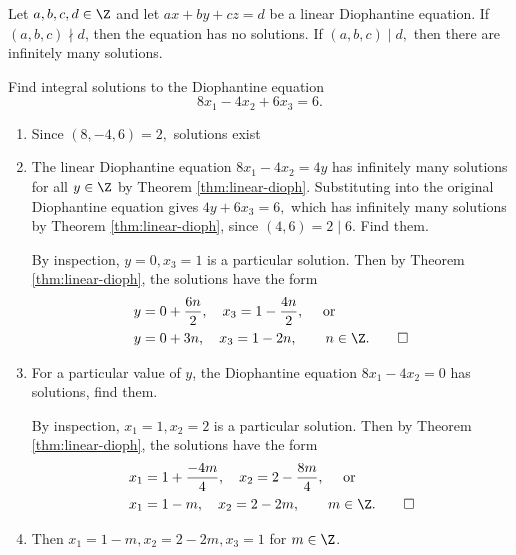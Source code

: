 \documentclass{ximera}
\begin{document}
\begin{proposition}\label{prop:3diophantine}
    Let $a,b,c,d\in\Z$ and let $ax+by+cz=d$ be a linear Diophantine equation. If $(a,b,c)\nmid d$, then the equation has no solutions. If $(a,b,c)\mid d,$ then there are infinitely many solutions.
\end{proposition}

\begin{br}
Find integral solutions to the Diophantine equation \[8x_1-4x_2+6x_3=6.\]

\begin{enumerate}
    \item Since $(8,-4,6)=2,$ solutions exist
    \item The linear Diophantine equation $8x_1-4x_2=4y$ has infinitely many solutions for all $y\in\Z$ by Theorem \ref{thm:linear-dioph}. Substituting into the original Diophantine equation gives $4y+6x_3=6,$ which has infinitely many solutions by Theorem \ref{thm:linear-dioph}, since $(4,6)=2\mid 6$. Find them.
     
    \begin{solution}
        By inspection, $y=0,x_3=1$ is a particular solution. Then by Theorem \ref{thm:linear-dioph}, the solutions have the form 
        \begin{align*}
            y&=0+\frac{6n}{2},\quad x_3=1-\frac{4n}{2}, \quad \textnormal{ or }\\
            y&=0+3n,\quad x_3=1-2n, \qquad n\in\Z. \qedhere
        \end{align*}
        \end{solution}
    \item  For a particular value of $y$, the Diophantine equation $8x_1-4x_2=0$ has solutions, find them. 
    \begin{solution}
        By inspection, $x_1=1,x_2=2$ is a particular solution. Then by Theorem \ref{thm:linear-dioph}, the solutions have the form 
        \begin{align*}
            x_1&=1+\frac{-4m}{4},\quad x_2=2-\frac{8m}{4}, \quad \textnormal{ or }\\
            x_1&=1-m,\quad x_2=2-2m, \qquad m\in\Z. \qedhere
        \end{align*}
        \end{solution}
    \item Then $x_1=1-m, x_2=2-2m,x_3=1$ for $m\in\Z$.
\end{enumerate}
\end{br}
\end{document}
